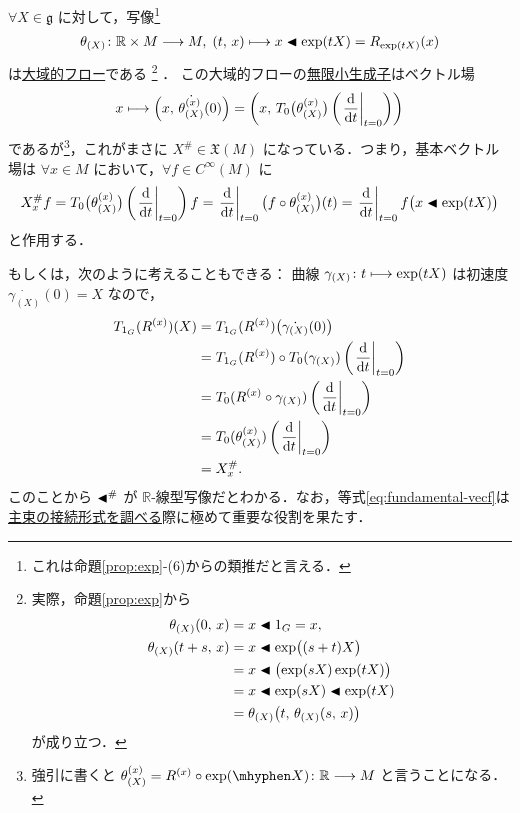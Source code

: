 \documentclass[TQFT_main]{subfiles}
\begin{document}
$\forall X \in \mathfrak{g}$ に対して，\cinfty 写像\footnote{これは命題\ref{prop:exp}-(6)からの類推だと言える．}
\begin{align}
    \theta_{(X)} \colon \mathbb{R} \times M \longrightarrow M,\; (t,\, x) \longmapsto x \blacktriangleleft \exp(tX) = R_{\exp(tX)} (x)
\end{align}
は\hyperref[def:flow-global]{大域的フロー}である
\footnote{
    実際，命題\ref{prop:exp}から
    \begin{align}
        \theta_{(X)}(0,\, x) &= x \blacktriangleleft 1_G = x, \\
        \theta_{(X)}(t+s,\, x) &= x \blacktriangleleft \exp \bigl( (s+t) X \bigr) \\
        &= x \blacktriangleleft \bigl(\exp(sX)\exp(tX)\bigr) \\
        &= x \blacktriangleleft \exp(sX) \blacktriangleleft \exp(tX) \\
        &= \theta_{(X)} \bigl(t ,\, \theta_{(X)}(s,\, x)\bigr)
    \end{align}
    が成り立つ．
}
．
この大域的フローの\hyperref[def:thm:fundamental-flow]{無限小生成子}はベクトル場
\begin{align}
    x \lmto \Bigl( x,\, \dot{\theta_{(X)}^{(x)}} (0) \Bigr) = \left( x,\, T_0 \bigl( \theta_{(X)}^{(x)} \bigr) \left( \eval{\dv{}{t}}_{t=0} \right)   \right) 
\end{align}
であるが\footnote{強引に書くと $\theta^{(x)}_{(X)} = R^{(x)} \circ \exp (\mhyphen X) \colon \mathbb{R} \lto M$ と言うことになる．}，これがまさに $X^\# \in \mathfrak{X}(M)$ になっている．つまり，基本ベクトル場は $\forall x \in M$ において，$\forall f \in C^\infty (M)$ に
\begin{align}
    X^\#_x f = T_0 \bigl( \theta_{(X)}^{(x)} \bigr) \left( \eval{\dv{}{t}}_{t=0} \right)f = \eval{\dv{}{t}}_{t=0} \bigl( f \circ \theta_{(X)}^{(x)}  \bigr) (t) = \eval{\dv{}{t}}_{t=0} f \bigl(x \btl \exp(tX)\bigr)
\end{align}
と作用する．

もしくは，次のように考えることもできる：
曲線 $\gamma_{(X)} \colon t  \longmapsto \exp(tX)$ は初速度 $\dot{\gamma_{(X)}}(0) = X$ なので，
\begin{align}
    T_{1_G}(R^{(x)}) (X) 
    &= T_{1_G} (R^{(x)}) \bigl( \dot{\gamma_{(X)}}(0) \bigr) \\
    &= T_{1_G} (R^{(x)}) \circ T_0 (\gamma_{(X)}) \left( \eval{\dv{}{t}}_{t=0} \right) \\
    &= T_0 (R^{(x)} \circ \gamma_{(X)}) \left( \eval{\dv{}{t}}_{t=0} \right) \\
    &= T_0 (\theta_{(X)}^{(x)})\left( \eval{\dv{}{t}}_{t=0} \right) \\
    &= X^\#_x. \label{eq:fundamental-vecf}
\end{align}
このことから $\blacktriangleleft^\#$ が $\mathbb{R}$-線型写像だとわかる．なお，等式\eqref{eq:fundamental-vecf}は\hyperref[thm:connection-basic]{主束の接続形式を調べる}際に極めて重要な役割を果たす．
\end{document}
